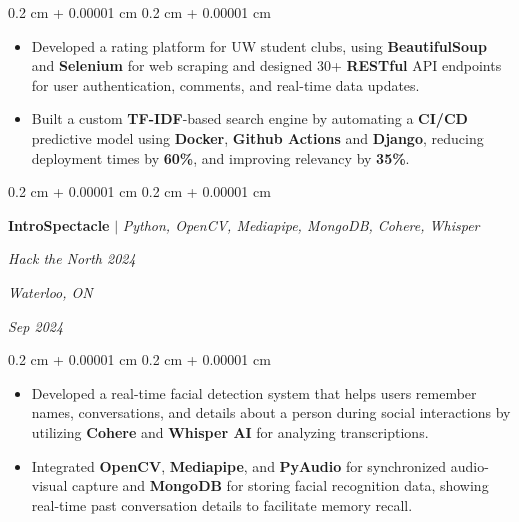 \documentclass[10pt, letterpaper]{article}
\newenvironment{highlights}{
    \begin{itemize}[
        topsep=0.10 cm,
        parsep=0.10 cm,
        partopsep=0pt,
        itemsep=0pt,
        leftmargin=0.4 cm + 10pt
    ]
}{
    \end{itemize}
} %
\newenvironment{onecolentry}{
    \begin{adjustwidth}{
        0.2 cm + 0.00001 cm
    }{
        0.2 cm + 0.00001 cm
    }
}{
    \end{adjustwidth}
} %
\newenvironment{twocolentry}[2][]{
    \onecolentry
    \def\secondColumn{#2}
    \setcolumnwidth{\fill, 4.5 cm}
    \begin{paracol}{2}
}{
    \switchcolumn \raggedleft \secondColumn
    \end{paracol}
    \endonecolentry
} %
\let\hrefWithoutArrow\href
\renewcommand{\href}[2]{\hrefWithoutArrow{#1}{\ifthenelse{\equal{#2}{}}{ }{#2 }\raisebox{.15ex}{\footnotesize \faExternalLink*}}}
\begin{document}
        \vspace{0.10 cm}
        \begin{onecolentry}
            \begin{highlights}
                \item Developed a rating platform for UW student clubs, using \textbf{BeautifulSoup} and \textbf{Selenium} for web scraping and designed 30+ \textbf{RESTful} API endpoints for user authentication, comments, and real-time data updates.
                \item Built a custom \textbf{TF-IDF}-based search engine by automating a \textbf{CI/CD} predictive model using \textbf{Docker}, \textbf{Github Actions} and \textbf{Django}, reducing deployment times by \textbf{60\%}, and improving relevancy by \textbf{35\%}.
                
            \end{highlights}
        \end{onecolentry}

        \vspace{0.2 cm}

       \begin{twocolentry}{
         \textit{Waterloo, ON}    
            
        \textit{Sep 2024}}
            \textbf{\textbf{IntroSpectacle }}\mbox{\hrefWithoutArrow{https://github.com/vinny-nguyen/IntroSpectacle}{\color{black}{\footnotesize\faGithub}}}
            $|$ \emph{Python, OpenCV, Mediapipe, MongoDB, Cohere, Whisper}
            
            \textit{Hack the North 2024}
        \end{twocolentry}
        
        \vspace{0.10 cm}
        \begin{onecolentry}
            \begin{highlights}
                \item Developed a real-time facial detection system that helps users remember names, conversations, and details about a person during social interactions by utilizing \textbf{Cohere} and \textbf{Whisper AI} for analyzing transcriptions.
                \item Integrated \textbf{OpenCV}, \textbf{Mediapipe}, and \textbf{PyAudio} for synchronized audio-visual capture and \textbf{MongoDB} for storing facial
recognition data, showing real-time past conversation details to facilitate memory recall.
            \end{highlights}
        \end{onecolentry}
\end{document}
